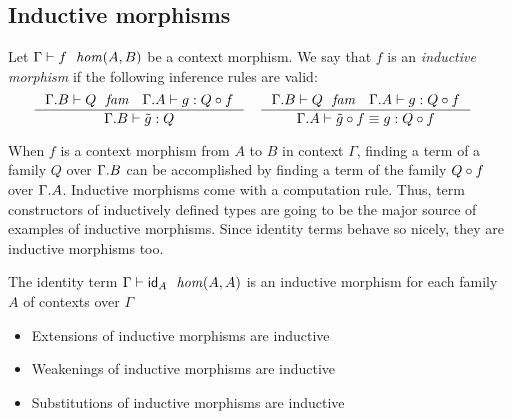 \subsection{Inductive morphisms}
\begin{defn}
Let $\jhom{\Gamma}{A}{B}{f}$ be a context morphism. We say that $f$ is an 
\emph{inductive morphism} if the following inference rules are valid:
\begin{align*}
& \inference
  { \jfam{{\Gamma}{B}}{Q}
    \jterm{{\Gamma}{A}}{\jcomp{A}{f}{Q}}{g}
    }
  { \jterm{{\Gamma}{B}}{Q}{\jtcext{g}}
    }
& & \inference
  { \jfam{{\Gamma}{B}}{Q}
    \jterm{{\Gamma}{A}}{\jcomp{A}{f}{Q}}{g}
    }
  { \jtermeq{{\Gamma}{A}}{\jcomp{A}{f}{Q}}{\jcomp{A}{f}{\jtcext{g}}}{g}
    }
\end{align*}
\end{defn}

When $f$ is a context morphism from $A$ to $B$ in context $\Gamma$, 
finding a term of a family $Q$ over $\ctxext{\Gamma}{B}$ can be accomplished
by finding a term of the family $\jcomp{A}{f}{Q}$ over $\ctxext{\Gamma}{A}$.
Inductive morphisms come with a computation rule. Thus, term
constructors of inductively defined types are going to be the major source of
examples of inductive morphisms. Since identity terms behave
so nicely, they are inductive morphisms too.

\begin{lem}
The identity term
$\jhom{\Gamma}{A}{A}{\idtm{A}}$ is an inductive morphism
for each family $A$ of contexts over $\Gamma$
\end{lem}

\begin{itemize}
\item Extensions of inductive morphisms are inductive
\item Weakenings of inductive morphisms are inductive
\item Substitutions of inductive morphisms are inductive
\end{itemize}


